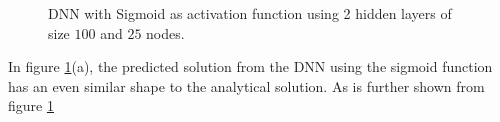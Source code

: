 \documentclass{article}
\theoremstyle{definition}
\begin{document}
\begin{figure}[H]%
    \centering
    \qquad
    \caption{DNN with Sigmoid as activation function using 2 hidden layers of size $100$ and $25$ nodes.}%
    \label{fig:DNN_Sigmoid_3d}%
\end{figure}
In figure \ref{fig:DNN_Sigmoid_3d}(a), the predicted solution from the DNN using the sigmoid function has an even similar shape to the analytical solution. As is further shown from figure \ref{fig:DNN_Sigmoid_3d}
\end{document}
